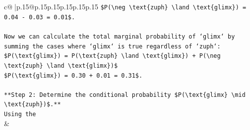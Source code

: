 \documentclass{article}
\begin{document}
{\begin{supertabular}{c@{$\;$}|p{.15\linewidth}@{}p{.15\linewidth}p{.15\linewidth}p{.15\linewidth}p{.15\linewidth}p{.15\linewidth}}
{{{\texttt{\$P(\textbackslash{}neg \textbackslash{}text\{zuph\} \textbackslash{}land \textbackslash{}text\{glimx\}) = 0.04 {-} 0.03 = 0.01\$.} \\
\\ 
\texttt{Now we can calculate the total marginal probability of `glimx` by summing the cases where `glimx` is true regardless of `zuph`:} \\
\texttt{\$P(\textbackslash{}text\{glimx\}) = P(\textbackslash{}text\{zuph\} \textbackslash{}land \textbackslash{}text\{glimx\}) + P(\textbackslash{}neg \textbackslash{}text\{zuph\} \textbackslash{}land \textbackslash{}text\{glimx\})\$} \\
\texttt{\$P(\textbackslash{}text\{glimx\}) = 0.30 + 0.01 = 0.31\$.} \\
\\ 
\texttt{**Step 2: Determine the conditional probability \$P(\textbackslash{}text\{glimx\} \textbackslash{}mid \textbackslash{}text\{zuph\})\$.**} \\
\texttt{Using the} \\
            }
        }
    }
    & \\ \\


\end{supertabular}}
\end{document}
